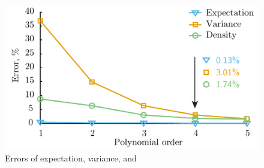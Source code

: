 \begin{figure}
  \centering
  \includegraphics[width=0.8\columnwidth]{include/assets/accuracy.pdf}
  \caption{Errors of expectation, variance, and \pdf}
  \vspace{-2em}
\end{figure}
